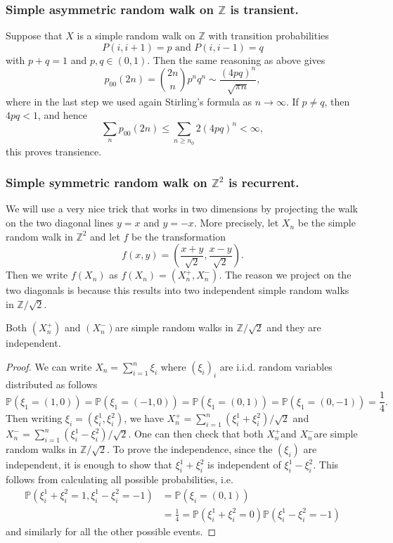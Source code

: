 \documentclass[a4paper,11pt]{article}
\begin{document}
\subsubsection*{Simple asymmetric random walk on $ \mathbb{Z} $ is transient.} 
Suppose that $X$ is a simple random walk on $\mathbb{Z}$ with transition probabilities
\[
P(i, i+1)=p \text { and } P(i, i-1)=q
\]
with $p+q=1$ and $p, q \in(0,1)$. Then the same reasoning as above gives
\[
p_{00}(2 n)=\binom{2n}{n} p^n q^n \sim \frac{(4 p q)^n}{\sqrt{\pi n}},
\]
where in the last step we used again Stirling's formula as $n \rightarrow \infty$. If $p \neq q$, then $4 p q<1$, and hence
\[
\sum_n p_{00}(2 n) \leq \sum_{n \geq n_0} 2(4 p q)^n<\infty,
\]
this proves transience.

\subsubsection*{Simple symmetric random walk on $\mathbb{Z}^2$ is recurrent.}
We will use a very nice trick that works in two dimensions by projecting the walk on the two diagonal lines $y=x$ and $y=-x$. More precisely, let $X_n$ be the simple random walk in $\mathbb{Z}^2$ and let $f$ be the transformation
\[
f(x, y)=\left(\frac{x+y}{\sqrt{2}}, \frac{x-y}{\sqrt{2}}\right) .
\]
Then we write $f\left(X_n\right)$ as $f\left(X_n\right)=\left(X_n^{+}, X_n^{-}\right)$.
The reason we project on the two diagonals is because this results into two independent simple random walks in $\mathbb{Z} / \sqrt{2}$.

\begin{lemma}
    Both $\left(X_n^{+}\right)$ and $\left(X_n^{-}\right)$are simple random walks in $\mathbb{Z} / \sqrt{2}$ and they are independent.
\end{lemma}

\begin{proof}
    We can write $X_n=\sum_{i=1}^n \xi_i$ where $\left(\xi_i\right)_i$ are i.i.d. random variables distributed as follows
    \[
    \mathbb{P}\left(\xi_1=(1,0)\right)=\mathbb{P}\left(\xi_1=(-1,0)\right)=\mathbb{P}\left(\xi_1=(0,1)\right)=\mathbb{P}\left(\xi_1=(0,-1)\right)=\frac{1}{4} .
    \]
    Then writing $\xi_i=\left(\xi_i^1, \xi_i^2\right)$, we have $X_n^{+}=\sum_{i=1}^n\left(\xi_i^1+\xi_i^2\right) / \sqrt{2}$ and $X_n^{-}=\sum_{i=1}^n\left(\xi_i^1-\xi_i^2\right) / \sqrt{2}$. One can then check that both $X_n^{+}$and $X_n^{-}$are simple random walks in $\mathbb{Z} / \sqrt{2}$. To prove the independence, since the $\left(\xi_i\right)$ are independent, it is enough to show that $\xi_i^1+\xi_i^2$ is independent of $\xi_i^1-\xi_i^2$. This follows from calculating all possible probabilities, i.e.
    \begin{align*}
        \mathbb{P}\left(\xi_i^1+\xi_i^2=1, \xi_i^1-\xi_i^2=-1\right)&=\mathbb{P}\left(\xi_i=(0,1)\right)\\ 
        &=\frac{1}{4}=\mathbb{P}\left(\xi_i^1+\xi_i^2=0\right) \mathbb{P}\left(\xi_i^1-\xi_i^2=-1\right)
    \end{align*}
    and similarly for all the other possible events.
\end{proof}
\end{document}
